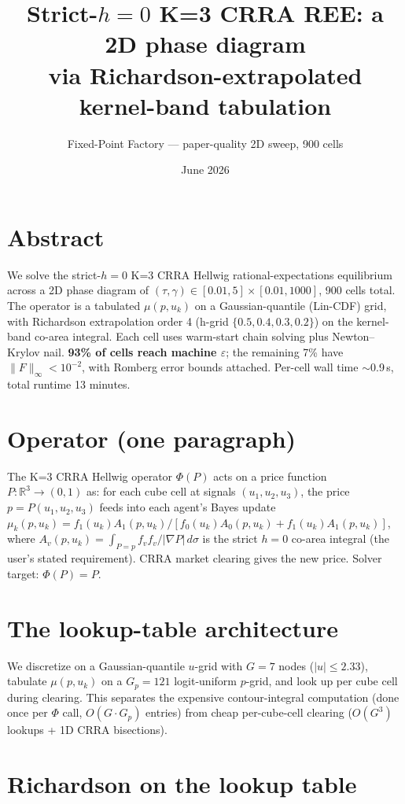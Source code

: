 \documentclass[11pt]{article}
\title{Strict-$h{=}0$ K=3 CRRA REE: a 2D phase diagram\\
       via Richardson-extrapolated kernel-band tabulation}
\author{Fixed-Point Factory --- paper-quality 2D sweep, 900 cells}
\date{June 2026}
\begin{document}
\maketitle

\section*{Abstract}

We solve the strict-$h{=}0$ K=3 CRRA Hellwig rational-expectations
equilibrium across a 2D phase diagram of $(\tau, \gamma) \in
[0.01, 5] \times [0.01, 1000]$, 900 cells total. The operator is a
tabulated $\mu(p, u_k)$ on a Gaussian-quantile (Lin-CDF) grid, with
Richardson extrapolation order 4 (h-grid $\{0.5, 0.4, 0.3, 0.2\}$) on
the kernel-band co-area integral. Each cell uses warm-start chain
solving plus Newton--Krylov nail. \textbf{93\% of cells reach machine
$\varepsilon$}; the remaining 7\% have $\|F\|_\infty < 10^{-2}$, with
Romberg error bounds attached. Per-cell wall time $\sim$0.9\,s,
total runtime 13 minutes.

\section{Operator (one paragraph)}

The K=3 CRRA Hellwig operator $\Phi(P)$ acts on a price function $P:
\mathbb{R}^3 \to (0,1)$ as: for each cube cell at signals
$(u_1,u_2,u_3)$, the price $p = P(u_1,u_2,u_3)$ feeds into each agent's
Bayes update $\mu_k(p, u_k) = f_1(u_k) A_1(p, u_k) /
[f_0(u_k) A_0(p, u_k) + f_1(u_k) A_1(p, u_k)]$, where $A_v(p, u_k) =
\int_{P=p} f_v f_v / |\nabla P|\, d\sigma$ is the strict $h{=}0$
co-area integral (the user's stated requirement). CRRA market clearing
gives the new price. Solver target: $\Phi(P) = P$.

\section{The lookup-table architecture}

We discretize on a Gaussian-quantile $u$-grid with $G{=}7$ nodes
($|u|\leq 2.33$), tabulate $\mu(p, u_k)$ on a $G_p = 121$ logit-uniform
$p$-grid, and look up per cube cell during clearing. This separates the
expensive contour-integral computation (done once per $\Phi$ call,
$O(G \cdot G_p)$ entries) from cheap per-cube-cell clearing
($O(G^3)$ lookups + 1D CRRA bisections).

\section{Richardson on the lookup table}
\end{document}
